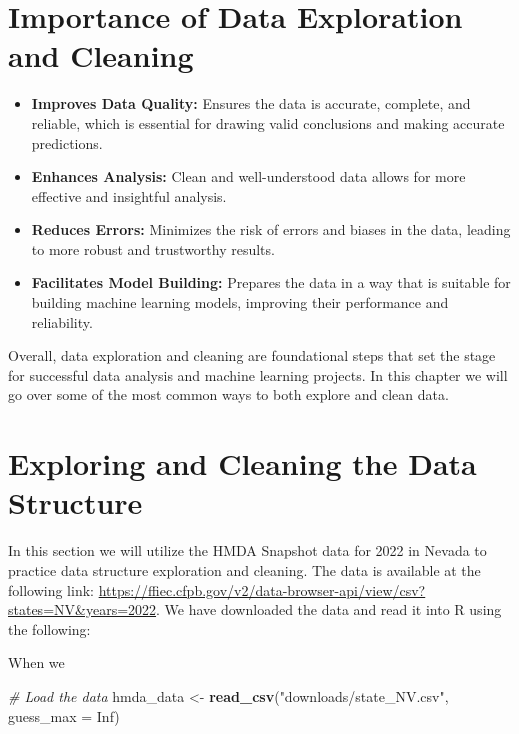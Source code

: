 \documentclass[
]{book}
\newenvironment{Shaded}{\begin{snugshade}}{\end{snugshade}}
\newcommand{\AttributeTok}[1]{\textcolor[rgb]{0.13,0.29,0.53}{#1}}
\newcommand{\CommentTok}[1]{\textcolor[rgb]{0.56,0.35,0.01}{\textit{#1}}}
\newcommand{\ConstantTok}[1]{\textcolor[rgb]{0.56,0.35,0.01}{#1}}
\newcommand{\FunctionTok}[1]{\textcolor[rgb]{0.13,0.29,0.53}{\textbf{#1}}}
\newcommand{\NormalTok}[1]{#1}
\newcommand{\OtherTok}[1]{\textcolor[rgb]{0.56,0.35,0.01}{#1}}
\newcommand{\StringTok}[1]{\textcolor[rgb]{0.31,0.60,0.02}{#1}}
\providecommand{\tightlist}{%
  \setlength{\itemsep}{0pt}\setlength{\parskip}{0pt}}
\begin{document}
\hypertarget{importance-of-data-exploration-and-cleaning}{%
\section*{Importance of Data Exploration and Cleaning}\label{importance-of-data-exploration-and-cleaning}}

\begin{itemize}
\tightlist
\item
  \textbf{Improves Data Quality:} Ensures the data is accurate, complete, and reliable, which is essential for drawing valid conclusions and making accurate predictions.
\item
  \textbf{Enhances Analysis:} Clean and well-understood data allows for more effective and insightful analysis.
\item
  \textbf{Reduces Errors:} Minimizes the risk of errors and biases in the data, leading to more robust and trustworthy results.
\item
  \textbf{Facilitates Model Building:} Prepares the data in a way that is suitable for building machine learning models, improving their performance and reliability.
\end{itemize}

Overall, data exploration and cleaning are foundational steps that set the stage for successful data analysis and machine learning projects. In this chapter we will go over some of the most common ways to both explore and clean data.

\hypertarget{exploring-and-cleaning-the-data-structure}{%
\section{Exploring and Cleaning the Data Structure}\label{exploring-and-cleaning-the-data-structure}}

In this section we will utilize the HMDA Snapshot data for 2022 in Nevada to practice data structure exploration and cleaning. The data is available at the following link: \url{https://ffiec.cfpb.gov/v2/data-browser-api/view/csv?states=NV\&years=2022}. We have downloaded the data and read it into R using the following:

When we

\begin{Shaded}
\begin{Highlighting}[]
\CommentTok{\# Load the data}
\NormalTok{hmda\_data }\OtherTok{\textless{}{-}} \FunctionTok{read\_csv}\NormalTok{(}\StringTok{"downloads/state\_NV.csv"}\NormalTok{, }\AttributeTok{guess\_max =} \ConstantTok{Inf}\NormalTok{)}
\end{Highlighting}
\end{Shaded}
\end{document}
